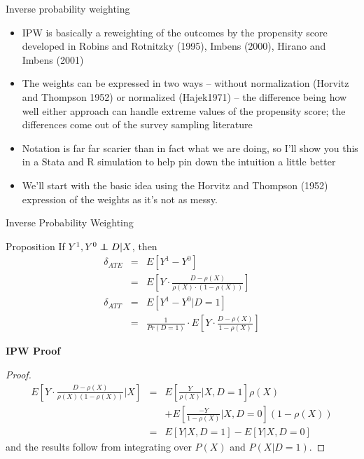 \documentclass{beamer}
\newcommand\independent{\protect\mathpalette{\protect\independenT}{\perp}}
\def\independenT#1#2{\mathrel{\rlap{$#1#2$}\mkern2mu{#1#2}}}
\begin{document}
\begin{frame}{Inverse probability weighting}

\begin{itemize}
	\item IPW is basically a reweighting of the outcomes by the propensity score developed in Robins and Rotnitzky (1995), Imbens (2000), Hirano and Imbens (2001)
	\item The weights can be expressed in two ways -- without normalization (Horvitz and Thompson 1952) or normalized (Hajek1971) -- the difference being how well either approach can handle extreme values of the propensity score; the differences come out of the survey sampling literature 
	\item Notation is far far scarier than in fact what we are doing, so I'll show you this in a Stata and R simulation to help pin down the intuition a little better
	\item We'll start with the basic idea using the Horvitz and Thompson (1952) expression of the weights as it's not as messy.
\end{itemize}

\end{frame}
	
	

\begin{frame}{Inverse Probability Weighting}
	
		\begin{block}{Proposition}
	If $Y^1,Y^0 \independent{D}|X$, then
		\begin{eqnarray*}
		\delta_{ATE}&=&E[Y^1-Y^0] \\
		&=&E \left[ Y \cdot  \frac{D - \rho(X)}{\rho(X) \cdot (1-\rho(X))} \right]\\
		\delta_{ATT}&=&E[Y^1-Y^0|D=1] \\
		&=& \frac{1}{Pr(D=1)} \cdot  E \left[ Y \cdot \frac{D-\rho(X)}{1-\rho(X)} \right]
		\end{eqnarray*}
	\end{block}

\end{frame}

\begin{frame}[plain,shrink=5]
\begin{center}
\textbf{IPW Proof}
\end{center}

	\begin{proof}
	\begin{eqnarray*}
	E \left[ Y \cdot \frac{D-\rho(X)}{\rho(X)(1-\rho(X))} \Big\vert X \right] &=& E \left[ \frac{Y}{\rho(X)} \Big\vert X,D=1 \right] \rho(X) \\
	&& + E\left[ \frac{-Y}{1-\rho(X)} \Big\vert X,D=0 \right](1-\rho(X)) \\
	&=& E[Y|X,D=1] - E[Y|X,D=0]
	\end{eqnarray*}and the results follow from integrating over $P(X)$ and $P(X|D=1)$.
	\end{proof}

\end{frame}
\end{document}

